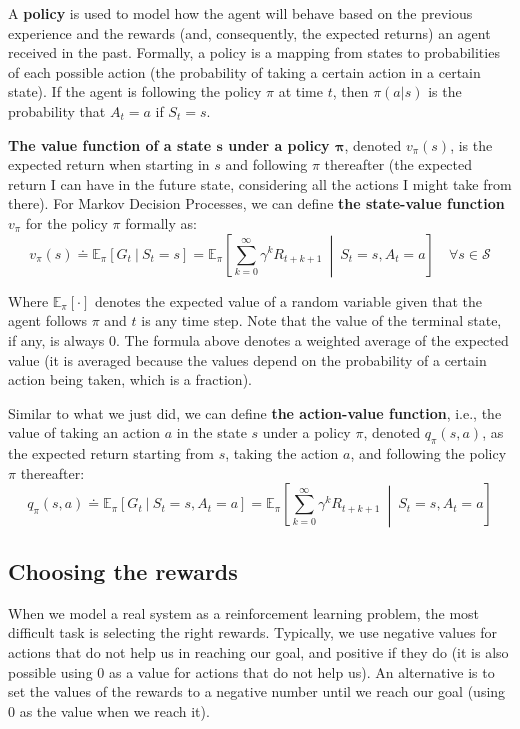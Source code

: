 A \textbf{policy} is used to model how the agent will behave based on the previous experience and the rewards (and, consequently, the expected returns) an agent received in the past. Formally, a policy is a mapping from states to probabilities of each possible action (the probability of taking a certain action in a certain state). If the agent is following the policy $\pi$ at time $t$, then $\pi (a \vert s)$ is the probability that $A_t=a$ if $S_t=s$.

\textbf{The value function of a state $\boldsymbol{s}$ under a policy $\boldsymbol{\pi}$}, denoted $v_\pi (s)$, is the expected return when starting in $s$ and following $\pi$ thereafter (the expected return I can have in the future state, considering all the actions I might take from there). For Markov Decision Processes, we can define \textbf{the state-value function} $v_\pi$ for the policy $\pi$ formally as:
\begin{equation}
    v_\pi(s) \doteq \mathbb{E}_\pi \left[ G_t  \ \vert \  S_t = s \right] = \mathbb{E}_\pi \left[ \sum_{k=0}^{\infty}  \gamma^k R_{t+k+1} \  \middle\vert \  S_t = s, A_t = a \right] \quad \forall s \in \mathcal{S}
    \label{eq:ch2-statevaluefunction}
\end{equation}

Where $\mathbb{E}_\pi [\cdot]$ denotes the expected value of a random variable given that the agent follows $\pi$ and $t$ is any time step. Note that the value of the terminal state, if any, is always $0$. The formula above denotes a weighted average of the expected value (it is averaged because the values depend on the probability of a certain action being taken, which is a fraction).

Similar to what we just did, we can define \textbf{the action-value function}, i.e., the value of taking an action $a$ in the state $s$ under a policy $\pi$, denoted $q_\pi (s,a)$, as the expected return starting from $s$, taking the action $a$, and following the policy $\pi$ thereafter:
\begin{equation}
    q_\pi(s,a) \doteq \mathbb{E}_\pi \left[ G_t \  \vert \  S_t = s, A_t = a \right] = \mathbb{E}_\pi \left[ \sum_{k=0}^{\infty} \gamma^k R_{t+k+1} \  \middle\vert \ S_t = s, A_t = a \right]
    \label{eq:ch2-actionvaluefunction}
\end{equation}

\subsection{Choosing the rewards}
When we model a real system as a reinforcement learning problem, the most difficult task is selecting the right rewards. Typically, we use negative values for actions that do not help us in reaching our goal, and positive if they do (it is also possible using 0 as a value for actions that do not help us). An alternative is to set the values of the rewards to a negative number until we reach our goal (using 0 as the value when we reach it).

